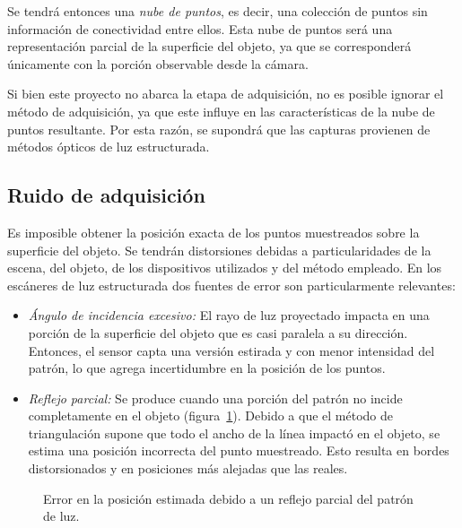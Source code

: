 Se tendrá entonces una \emph{nube de puntos}, es decir, una colección de puntos
sin información de conectividad entre ellos.
Esta nube de puntos será una representación parcial de la superficie del objeto,
ya que se corresponderá únicamente con la porción observable desde la cámara.


Si bien este proyecto no abarca la etapa de adquisición,
no es posible ignorar el método de adquisición,
ya que este influye en las características de la nube de puntos resultante.
Por esta razón, se supondrá que las capturas provienen de métodos ópticos de luz estructurada.


\subsection{Ruido de adquisición}
Es imposible obtener la posición exacta de los puntos muestreados sobre la superficie del objeto.
Se tendrán distorsiones debidas a particularidades de la escena, del objeto, de los
dispositivos utilizados y del método empleado.
En los escáneres de luz estructurada dos fuentes de error son particularmente relevantes:
\begin{itemize}
	\item \emph{Ángulo de incidencia excesivo:}
		El rayo de luz proyectado impacta en una porción de la superficie del objeto
		que es casi paralela a su dirección.
		Entonces, el sensor capta
		una versión estirada y con menor intensidad del patrón, %
		lo que agrega incertidumbre en la posición de los puntos.
	\item \emph{Reflejo parcial:}
		Se produce cuando una porción del patrón no incide completamente en el objeto (figura~\ref{fig:error_adquisicion}).
		Debido a que el método de triangulación supone que todo el ancho de la línea impactó en el objeto,
		se estima una posición incorrecta del punto muestreado.
		Esto resulta en bordes distorsionados y en posiciones más alejadas que las reales.\cite{Turk:1994:ZPM:192161.192241}
\end{itemize}

\begin{figure}
		\caption[Error debido a un reflejo parcial]{\label{fig:error_adquisicion}Error en la posición estimada debido a un reflejo parcial del patrón de luz.}
\end{figure}

\endinput

